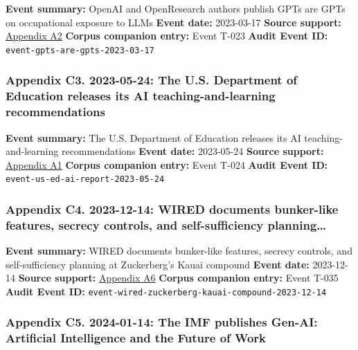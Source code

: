 \documentclass[
  american,
  11pt,
  letterpaper,
]{article}
\begin{document}
\textbf{Event summary:} OpenAI and OpenResearch authors publish GPTs are
GPTs on occupational exposure to LLMs \textbf{Event date:} 2023-03-17
\textbf{Source support:}
\hyperref[ch-09-appendix-a2-gpts-are-gpts-an-early-look-at-the-labor-market-impact-potential-of-large-language-models]{Appendix
A2} \textbf{Corpus companion entry:} Event T-023 \textbf{Audit Event
ID:} \texttt{event-gpts-are-gpts-2023-03-17}

\subsubsection{Appendix C3. 2023-05-24: The U.S. Department of Education
releases its AI teaching-and-learning
recommendations}\label{ch-09-appendix-c3-2023-05-24-the-u-s-department-of-education-releases-its-ai-teaching-and-learning-recommendations}

\textbf{Event summary:} The U.S. Department of Education releases its AI
teaching-and-learning recommendations \textbf{Event date:} 2023-05-24
\textbf{Source support:}
\hyperref[ch-09-appendix-a1-artificial-intelligence-and-the-future-of-teaching-and-learning-insights-and-recommendations]{Appendix
A1} \textbf{Corpus companion entry:} Event T-024 \textbf{Audit Event
ID:} \texttt{event-us-ed-ai-report-2023-05-24}

\subsubsection{Appendix C4. 2023-12-14: WIRED documents bunker-like
features, secrecy controls, and self-sufficiency
planning\ldots{}}\label{ch-09-appendix-c4-2023-12-14-wired-documents-bunker-like-features-secrecy-controls-and-self-sufficiency-planning-at-zuckerberg-s-kauai-compound}

\textbf{Event summary:} WIRED documents bunker-like features, secrecy
controls, and self-sufficiency planning at Zuckerberg's Kauai compound
\textbf{Event date:} 2023-12-14 \textbf{Source support:}
\hyperref[ch-09-appendix-a6-inside-mark-zuckerbergs-top-secret-hawaii-compound]{Appendix
A6} \textbf{Corpus companion entry:} Event T-035 \textbf{Audit Event
ID:} \texttt{event-wired-zuckerberg-kauai-compound-2023-12-14}

\subsubsection{Appendix C5. 2024-01-14: The IMF publishes Gen-AI:
Artificial Intelligence and the Future of
Work}\label{ch-09-appendix-c5-2024-01-14-the-imf-publishes-gen-ai-artificial-intelligence-and-the-future-of-work}
\end{document}
